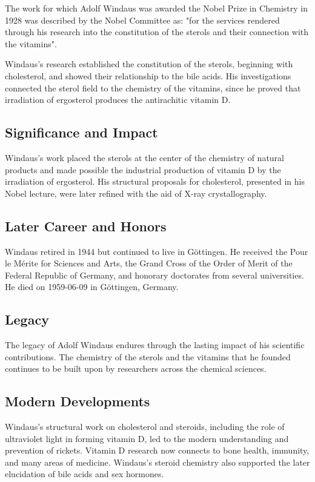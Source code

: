 The work for which Adolf Windaus was awarded the Nobel Prize in Chemistry in 1928 was described by the Nobel Committee as: "for the services rendered through his research into the constitution of the sterols and their connection with the vitamins".

Windaus's research established the constitution of the sterols, beginning with cholesterol, and showed their relationship to the bile acids.
His investigations connected the sterol field to the chemistry of the vitamins, since he proved that irradiation of ergosterol produces the antirachitic vitamin D.

\subsection*{Significance and Impact}

Windaus's work placed the sterols at the center of the chemistry of natural products and made possible the industrial production of vitamin D by the irradiation of ergosterol.
His structural proposals for cholesterol, presented in his Nobel lecture, were later refined with the aid of X-ray crystallography.

\subsection*{Later Career and Honors}

Windaus retired in 1944 but continued to live in Göttingen.
He received the Pour le Mérite for Sciences and Arts, the Grand Cross of the Order of Merit of the Federal Republic of Germany, and honorary doctorates from several universities.
He died on 1959-06-09 in Göttingen, Germany.

\subsection*{Legacy}

The legacy of Adolf Windaus endures through the lasting impact of his scientific contributions.
The chemistry of the sterols and the vitamins that he founded continues to be built upon by researchers across the chemical sciences.

\subsection*{Modern Developments}

Windaus's structural work on cholesterol and steroids, including the role of ultraviolet light in forming vitamin D, led to the modern understanding and prevention of rickets. Vitamin D research now connects to bone health, immunity, and many areas of medicine. Windaus's steroid chemistry also supported the later elucidation of bile acids and sex hormones.

